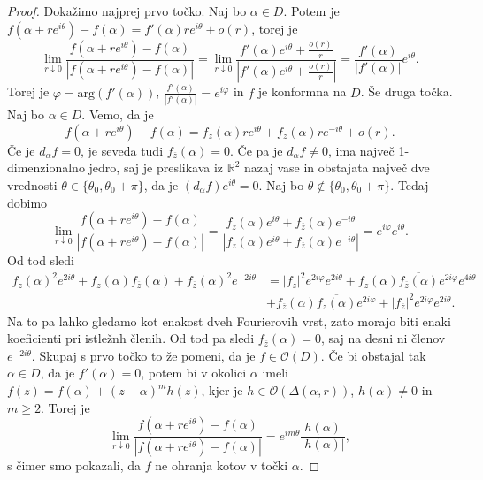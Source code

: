 \documentclass[10pt, a4paper]{article}
\newenvironment{noticeC}{%
  \tcolorbox[%
  notitle,
  empty,
  enhanced,  %
  breakable,
  coltext=black, 
  fontupper=\rmfamily,
  parbox=false,
  noparskip,
  sharp corners,
  boxrule=-1pt,  %
  frame hidden,
  left=7pt,  %
  right=7pt,
  top=5pt,
  bottom=5pt,
  before skip=2.5ex plus 2pt,
  after skip=2.5ex plus 2pt,
  overlay unbroken and last={%
  },
  ]}
{\endtcolorbox}
\newenvironment{dokaz}%
  {\begin{noticeC}\begin{proof}}%
  {\end{proof}\end{noticeC}}
\newcommand{\R}{\mathbb {R}}
\begin{document}
\begin{dokaz}
  Dokažimo najprej prvo točko. Naj bo $\alpha \in D$.
  Potem je $f(\alpha + re^{i \theta}) - f(\alpha) = f'(\alpha) re^{i\theta} + o(r)$, torej je 
  $$\lim_{r \downarrow 0} \frac{f(\alpha + re^{i\theta}) - f(\alpha)}{|f(\alpha + re^{i\theta}) - f(\alpha)|} = \lim_{r \downarrow 0} \frac{f'(\alpha) e^{i \theta} + \frac{o(r)}{r}}{|f'(\alpha) e^{i \theta} + \frac{o(r)}{r}|} = \frac{f'(\alpha)}{|f'(\alpha)|} e^{i\theta}.$$
  Torej je $\varphi = \mathrm{arg}(f'(\alpha))$, $\frac{f'(\alpha)}{|f'(\alpha)|} = e^{i \varphi}$ in $f$ je konformna na $D$.
  Še druga točka. Naj bo $\alpha \in D$.
  Vemo, da je 
  $$f(\alpha + re^{i \theta}) - f(\alpha) = f_z (\alpha) re^{i \theta} + f_{\overline{z}} (\alpha) re^{-i\theta} + o(r).$$
  Če je $d_\alpha f = 0$, je seveda tudi $f_{\overline{z}} (\alpha) = 0$.
  Če pa je $d_\alpha f \neq 0$, ima največ 1-dimenzionalno jedro,
  saj je preslikava iz $\R^2$ nazaj vase in obstajata največ dve vrednosti $\theta \in \{ \theta_0, \theta_0+ \pi \}$, da je 
  $(d_\alpha f)e^{i \theta} = 0$. Naj bo $\theta \notin \{\theta_0, \theta_0 + \pi\}$.
  Tedaj dobimo 
  $$\lim_{r \downarrow 0} \frac{f(\alpha + r e^{i \theta}) - f(\alpha)}{|f(\alpha + r e^{i \theta}) - f(\alpha)|} = \frac{f_z (\alpha) e^{i \theta} + f_{\overline{z}} (\alpha) e^{-i\theta}}{|f_z (\alpha) e^{i \theta} + f_{\overline{z}} (\alpha) e^{-i\theta}|} = e^{i\varphi} e^{i\theta}.$$
  Od tod sledi 
  \begin{align*}
    f_z (\alpha)^2 e^{2i \theta} + f_z (\alpha) f_{\overline{z}} (\alpha) + f_{\overline{z}} (\alpha)^2 e^{-2 i \theta} &= |f_z|^2 e^{2 i \varphi} e^{2 i \theta} + f_z (\alpha) \overline{f_{\overline{z}}(\alpha)} e^{2 i \varphi} e^{4i\theta}\\
    &+ f_{\overline{z}} (\alpha) \overline{f_z (\alpha)} e^{2 i \varphi} + |f_{\overline{z}}|^2 e^{2 i \varphi} e^{2 i \theta}.
  \end{align*}
  Na to pa lahko gledamo kot enakost dveh Fourierovih vrst, zato morajo biti enaki koeficienti pri istležnh členih.
  Od tod pa sledi $f_{\overline{z}} (\alpha) = 0$, saj na desni ni členov $e^{-2 i \theta}$.
  Skupaj s prvo točko to že pomeni, da je $f \in \mathcal{O} (D)$.
  Če bi obstajal tak $\alpha \in D$, da je $f'(\alpha) = 0$, potem bi v okolici $\alpha$
  imeli $f(z) = f(\alpha) + (z - \alpha)^m h(z)$, kjer je $h \in \mathcal{O} (\Delta (\alpha, r))$,
  $h(\alpha) \neq 0$ in $m \geq 2.$ Torej je 
  $$\lim_{r \downarrow 0} \frac{f(\alpha + r e^{i \theta}) - f(\alpha)}{|f(\alpha + r e^{i \theta}) - f(\alpha)|} = e^{i m \theta} \frac{h(\alpha)}{|h(\alpha)|},$$
  s čimer smo pokazali, da $f$ ne ohranja kotov v točki $\alpha$.
\end{dokaz}
\end{document}
